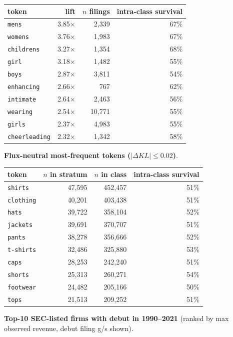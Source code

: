 \begin{tabular}{lrrr}
\toprule
token & lift & $n$ filings & intra-class survival \\
\midrule
\texttt{mens} & 3.85$\times$ & 2,339 & 67\% \\
\texttt{womens} & 3.76$\times$ & 1,983 & 67\% \\
\texttt{childrens} & 3.27$\times$ & 1,354 & 68\% \\
\texttt{girl} & 3.18$\times$ & 1,482 & 55\% \\
\texttt{boys} & 2.87$\times$ & 3,811 & 54\% \\
\texttt{enhancing} & 2.66$\times$ & 767 & 62\% \\
\texttt{intimate} & 2.64$\times$ & 2,463 & 56\% \\
\texttt{wearing} & 2.54$\times$ & 10,771 & 55\% \\
\texttt{girls} & 2.37$\times$ & 4,983 & 55\% \\
\texttt{cheerleading} & 2.32$\times$ & 1,342 & 58\% \\
\bottomrule
\end{tabular}

\textbf{Flux-neutral most-frequent tokens ($|\Delta KL|\leq 0.02$)}.

\begin{tabular}{lrrr}
\toprule
token & $n$ in stratum & $n$ in class & intra-class survival \\
\midrule
\texttt{shirts} & 47,595 & 452,457 & 51\% \\
\texttt{clothing} & 40,201 & 403,438 & 51\% \\
\texttt{hats} & 39,722 & 358,104 & 52\% \\
\texttt{jackets} & 39,691 & 370,707 & 51\% \\
\texttt{pants} & 38,278 & 356,666 & 52\% \\
\texttt{t-shirts} & 32,486 & 325,880 & 53\% \\
\texttt{caps} & 28,253 & 242,240 & 51\% \\
\texttt{shorts} & 25,313 & 260,271 & 54\% \\
\texttt{footwear} & 24,482 & 205,166 & 50\% \\
\texttt{tops} & 21,513 & 209,252 & 51\% \\
\bottomrule
\end{tabular}

\textbf{Top-10 SEC-listed firms with debut in 1990--2021} (ranked by max observed revenue, debut filing g/s shown).

